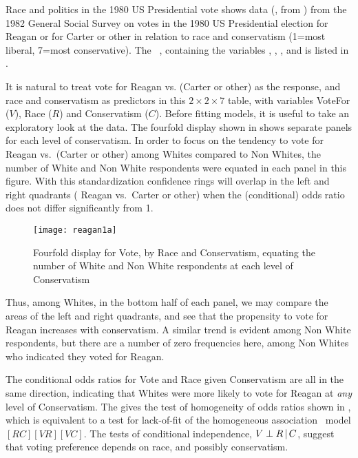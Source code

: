 \begin{Example}[reagan]{Race and politics in the 1980 US Presidential vote}
 shows data (\citet[Table 4.12]{Agresti:90}, from \citet{CloggShockey:88})
from the 1982 General Social Survey on
votes in the 1980 US Presidential election for Reagan or for Carter
or other in relation to race and conservatism (1=most liberal,
7=most conservative).
The \Dset\ , containing the
variables , , , and
 is listed in .



It is natural to treat vote for Reagan vs. (Carter or other) as the response,
and race and conservatism as predictors in this $2 \times 2 \times 7$
table, with variables VoteFor ($V$), Race ($R$) and Conservatism ($C$).
Before fitting models, it is useful to take an exploratory look
at the data.
The fourfold display shown in 
shows separate panels for each level of conservatism.
In order to focus on the tendency to vote for Reagan vs.\ (Carter or other)
among Whites compared to Non Whites,
the number of White and Non White respondents were equated in each
panel in this figure.
With this standardization confidence rings will overlap in the left
and right quadrants ( Reagan vs.\ Carter or other) when the (conditional)
odds ratio
does not differ significantly from 1.

\begin{figure}[htb]
  \centering
  \texttt{[image: reagan1a]}
  \caption[Fourfold display for Vote, by Race and Conservatism]{Fourfold display for Vote, by Race and Conservatism, equating the number of White and Non White respondents at each level of Conservatism}%
  \label{fig:reagan1a}
\end{figure}

Thus, among Whites, in the bottom half of each panel,
we may compare the areas of the left and right quadrants,
and see that the propensity to vote for Reagan increases with
conservatism.
A similar trend is evident among Non White respondents, but there
are a number of zero frequencies here, among Non Whites who indicated they
voted for Reagan.

The conditional odds ratios for Vote and Race given Conservatism are all in the same direction, indicating that Whites were more likely to vote for
Reagan at \emph{any} level of Conservatism.
The   gives the test of homogeneity of odds ratios
shown in ,
which is equivalent to a test for lack-of-fit of the
homogeneous association \loglin\ model $[RC] [VR] [VC]$.
The tests of conditional independence, $V \perp R \, | \, C$,
suggest that voting preference depends on race, and possibly conservatism.


\end{Example}
